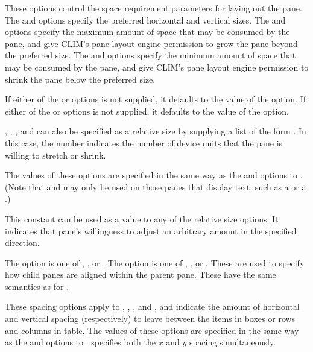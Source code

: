 These options control the space requirement parameters for laying out the pane.
The  and  options specify the preferred horizontal and
vertical sizes.  The  and  options specify the
maximum amount of space that may be consumed by the pane, and give CLIM's pane
layout engine permission to grow the pane beyond the preferred size.  The
 and  options specify the minimum amount of space
that may be consumed by the pane, and give CLIM's pane layout engine permission
to shrink the pane below the preferred size.

If either of the  or  options is not supplied, it
defaults to the value of the  option.  If either of the
 or  options is not supplied, it defaults to the
value of the  option.

, , , and  can
also be specified as a relative size by supplying a list of the form
.  In this case, the number indicates the number
of device units that the pane is willing to stretch or shrink.

The values of these options are specified in the same way as the 
and  options to .  (Note that
 and  may only be used on those panes that display
text, such as a  or a .)


This constant can be used as a value to any of the relative size options.  It
indicates that pane's willingness to adjust an arbitrary amount in the specified
direction.


The  option is one of , , or .
The  option is one of , , or .
These are used to specify how child panes are aligned within the parent pane.
These have the same semantics as for .


These spacing options apply to , , ,
and , and indicate the amount of horizontal and vertical spacing
(respectively) to leave between the items in boxes or rows and columns in table.
The values of these options are specified in the same way as the 
and  options to .   specifies
both the $x$ and $y$ spacing simultaneously.



